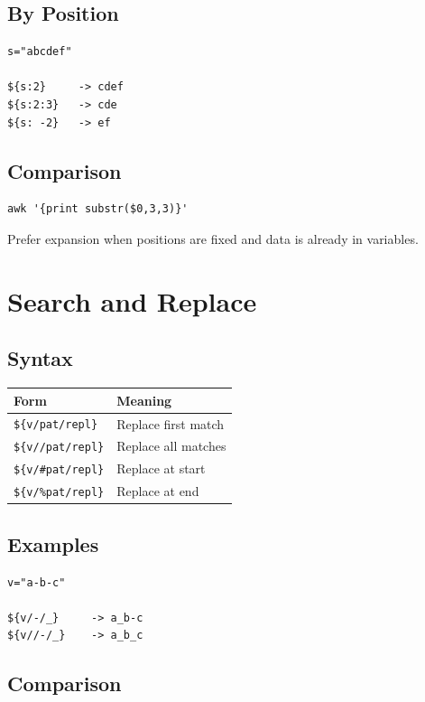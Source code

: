 \documentclass[11pt]{article}
\begin{document}
\subsection{By Position}

\begin{lstlisting}
s="abcdef"

${s:2}     -> cdef
${s:2:3}   -> cde
${s: -2}   -> ef
\end{lstlisting}

\subsection{Comparison}

\begin{lstlisting}
awk '{print substr($0,3,3)}'
\end{lstlisting}

Prefer expansion when positions are fixed and data is already in variables.

\section{Search and Replace}

\subsection{Syntax}

\begin{longtable}{ll}
\toprule
Form & Meaning \\
\midrule
\texttt{\$\{v/pat/repl\}}    & Replace first match \\
\texttt{\$\{v//pat/repl\}}   & Replace all matches \\
\texttt{\$\{v/\#pat/repl\}}  & Replace at start \\
\texttt{\$\{v/\%pat/repl\}}  & Replace at end \\
\bottomrule
\end{longtable}

\subsection{Examples}

\begin{lstlisting}
v="a-b-c"

${v/-/_}     -> a_b-c
${v//-/_}    -> a_b_c
\end{lstlisting}

\subsection{Comparison}
\end{document}
